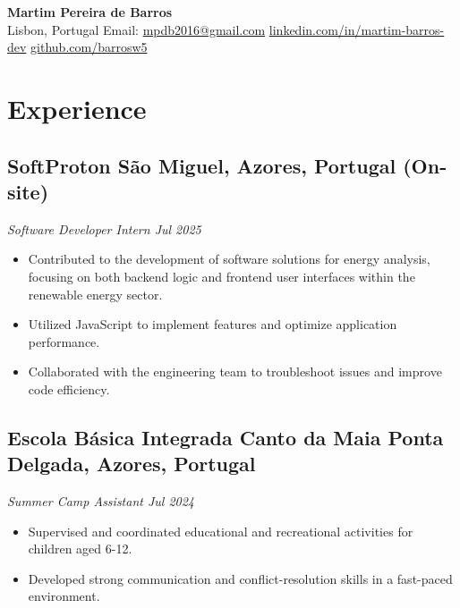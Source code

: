\documentclass[a4paper,10pt]{article}
\begin{document}
\begin{center}
    {\LARGE \textbf{Martim Pereira de Barros}} 
    \\ [0.1cm]
    Lisbon, Portugal
    {\textbullet}
    Email: \href{mailto:mpdb2016@gmail.com}{mpdb2016@gmail.com} 
    {\textbullet}
    \href{https://www.linkedin.com/in/martim-barros-dev/}{linkedin.com/in/martim-barros-dev} 
    {\textbullet}
    \href{https://github.com/barrosw5}{github.com/barrosw5}
\end{center}


\section{Experience}
    \subsection*{\texorpdfstring{
            \textbf{SoftProton} \hfill São Miguel, Azores, Portugal (On-site)
        }{
            SoftProton -- São Miguel, Azores, Portugal
        }}
    \textit{Software Developer Intern \hfill Jul 2025}
        \begin{itemize} 
            \item Contributed to the development of software solutions for energy analysis, focusing on both backend logic and frontend user interfaces within the renewable energy sector.
            \item Utilized JavaScript to implement features and optimize application performance.
            \item Collaborated with the engineering team to troubleshoot issues and improve code efficiency.
        \end{itemize}

    \subsection*{\texorpdfstring{
            \textbf{Escola Básica Integrada Canto da Maia} \hfill Ponta Delgada, Azores, Portugal
        }{
            Escola Básica Integrada Canto da Maia -- Ponta Delgada, Azores, Portugal
        }}
    \textit{Summer Camp Assistant \hfill Jul 2024}
        \begin{itemize}
            \item Supervised and coordinated educational and recreational activities for children aged 6-12.
            \item Developed strong communication and conflict-resolution skills in a fast-paced environment.
        \end{itemize}
        
\end{document}
